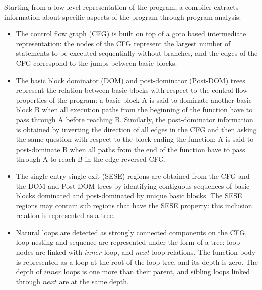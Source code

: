 \documentclass{sigplanconf}
\begin{document}
Starting from a low level representation of the program, a compiler extracts
information about specific aspects of the program through program analysis:

\begin{itemize}
\item The control flow graph (CFG) \cite{dragonbook} is built on top of a goto
  based intermediate representation: the nodes of the CFG represent the largest
  number of statements to be executed sequentially without branches, and the
  edges of the CFG correspond to the jumps between basic blocks.

\item The basic block dominator (DOM) and post-dominator (Post-DOM) trees
  \cite{dragonbook} represent the relation between basic blocks with respect to
  the control flow properties of the program: a basic block A is said to
  dominate another basic block B when all execution paths from the beginning of
  the function have to pass through A before reaching B.  Similarly, the
  post-dominator information is obtained by inverting the direction of all edges
  in the CFG and then asking the same question with respect to the block ending
  the function: A is said to post-dominate B when all paths from the end of the
  function have to pass through A to reach B in the edge-reversed CFG.

\item The single entry single exit (SESE) regions \cite{sese} are
  obtained from the CFG and the DOM and Post-DOM trees by identifying contiguous
  sequences of basic blocks dominated and post-dominated by unique basic blocks.
  The SESE regions may contain sub regions that have the SESE property: this
  inclusion relation is represented as a tree.

\item Natural loops \cite{dragonbook} are detected as strongly connected
  components \cite{tarjan} on the CFG, loop nesting and sequence are represented
  under the form of a tree: loop nodes are linked with $inner$ loop, and $next$
  loop relations.  The function body is represented as a loop at the root of the
  loop tree, and its depth is zero.  The depth of $inner$ loops is one more than
  their parent, and sibling loops linked through $next$ are at the same depth.



\end{itemize}
\end{document}
